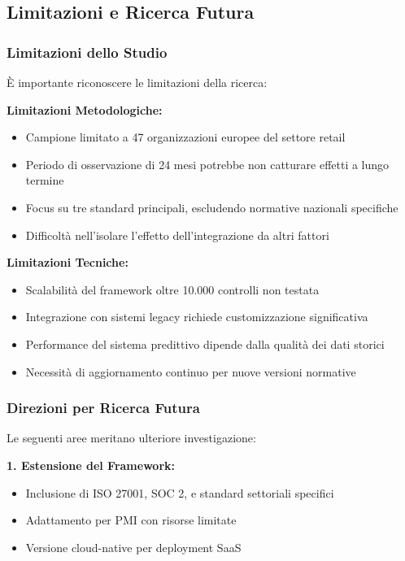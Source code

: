 \subsection{Limitazioni e Ricerca Futura}

\subsubsection{Limitazioni dello Studio}

È importante riconoscere le limitazioni della ricerca:

\textbf{Limitazioni Metodologiche:}
\begin{itemize}
    \item Campione limitato a 47 organizzazioni europee del settore retail
    \item Periodo di osservazione di 24 mesi potrebbe non catturare effetti a lungo termine
    \item Focus su tre standard principali, escludendo normative nazionali specifiche
    \item Difficoltà nell'isolare l'effetto dell'integrazione da altri fattori
\end{itemize}

\textbf{Limitazioni Tecniche:}
\begin{itemize}
    \item Scalabilità del framework oltre 10.000 controlli non testata
    \item Integrazione con sistemi legacy richiede customizzazione significativa
    \item Performance del sistema predittivo dipende dalla qualità dei dati storici
    \item Necessità di aggiornamento continuo per nuove versioni normative
\end{itemize}

\subsubsection{Direzioni per Ricerca Futura}

Le seguenti aree meritano ulteriore investigazione:

\textbf{1. Estensione del Framework:}
\begin{itemize}
    \item Inclusione di ISO 27001, SOC 2, e standard settoriali specifici
    \item Adattamento per PMI con risorse limitate
    \item Versione cloud-native per deployment SaaS
\end{itemize}

